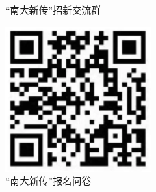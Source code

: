 \documentclass[letterpaper, 12pt]{article}
\begin{document}
\begin{figure}[htbp]
\begin{minipage}[b]{0.32\textwidth}
        \caption{“南大新传”招新交流群}
    \end{minipage}
    \begin{minipage}[b]{0.32\textwidth}
        \centering
        \includegraphics[width=0.5\textwidth]{Questionnare_JC.png}
        \caption{“南大新传”报名问卷}
    \end{minipage}
\end{figure}
\end{document}
